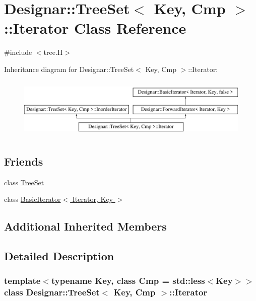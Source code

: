 \hypertarget{class_designar_1_1_tree_set_1_1_iterator}{}\section{Designar\+:\+:Tree\+Set$<$ Key, Cmp $>$\+:\+:Iterator Class Reference}
\label{class_designar_1_1_tree_set_1_1_iterator}


{\ttfamily \#include $<$tree.\+H$>$}

Inheritance diagram for Designar\+:\+:Tree\+Set$<$ Key, Cmp $>$\+:\+:Iterator\+:\begin{figure}[H]
\begin{center}
\leavevmode
\includegraphics[height=2.916667cm]{class_designar_1_1_tree_set_1_1_iterator}
\end{center}
\end{figure}
\subsection*{Friends}
\begin{DoxyCompactItemize}
\item 
class \hyperlink{class_designar_1_1_tree_set_1_1_iterator_a7caa42294700d2a60905ec3458a7cd8a}{Tree\+Set}
\item 
class \hyperlink{class_designar_1_1_tree_set_1_1_iterator_a0b375a570add16b09037ce1773f0ddbb}{Basic\+Iterator$<$ Iterator, Key $>$}
\end{DoxyCompactItemize}
\subsection*{Additional Inherited Members}


\subsection{Detailed Description}
\subsubsection*{template$<$typename Key, class Cmp = std\+::less$<$\+Key$>$$>$\newline
class Designar\+::\+Tree\+Set$<$ Key, Cmp $>$\+::\+Iterator}



